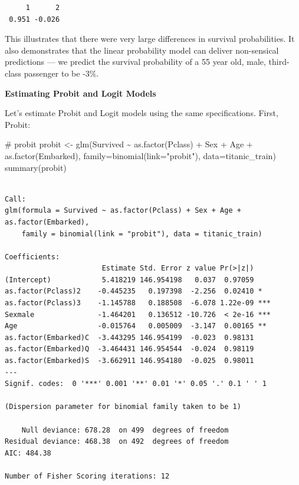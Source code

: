 \documentclass[
  letterpaper,
  DIV=11,
  numbers=noendperiod]{scrreprt}
\newenvironment{Shaded}{\begin{snugshade}}{\end{snugshade}}
\newcommand{\AttributeTok}[1]{\textcolor[rgb]{0.40,0.45,0.13}{#1}}
\newcommand{\CommentTok}[1]{\textcolor[rgb]{0.37,0.37,0.37}{#1}}
\newcommand{\FunctionTok}[1]{\textcolor[rgb]{0.28,0.35,0.67}{#1}}
\newcommand{\NormalTok}[1]{\textcolor[rgb]{0.00,0.23,0.31}{#1}}
\newcommand{\OtherTok}[1]{\textcolor[rgb]{0.00,0.23,0.31}{#1}}
\newcommand{\SpecialCharTok}[1]{\textcolor[rgb]{0.37,0.37,0.37}{#1}}
\newcommand{\StringTok}[1]{\textcolor[rgb]{0.13,0.47,0.30}{#1}}
\begin{document}
\begin{verbatim}
     1      2 
 0.951 -0.026 
\end{verbatim}

This illustrates that there were very large differences in survival
probabilities. It also demonstrates that the linear probability model
can deliver non-sensical predictions --- we predict the survival
probability of a 55 year old, male, third-class passenger to be -3\%.

\textbf{Estimating Probit and Logit Models}

Let's estimate Probit and Logit models using the same specifications.
First, Probit:

\begin{Shaded}
\begin{Highlighting}[]
\CommentTok{\# probit}
\NormalTok{probit }\OtherTok{\textless{}{-}} \FunctionTok{glm}\NormalTok{(Survived }\SpecialCharTok{\textasciitilde{}} \FunctionTok{as.factor}\NormalTok{(Pclass) }\SpecialCharTok{+}\NormalTok{ Sex }\SpecialCharTok{+}\NormalTok{ Age }\SpecialCharTok{+} \FunctionTok{as.factor}\NormalTok{(Embarked), }
              \AttributeTok{family=}\FunctionTok{binomial}\NormalTok{(}\AttributeTok{link=}\StringTok{"probit"}\NormalTok{), }
              \AttributeTok{data=}\NormalTok{titanic\_train)}
\FunctionTok{summary}\NormalTok{(probit)}
\end{Highlighting}
\end{Shaded}

\begin{verbatim}

Call:
glm(formula = Survived ~ as.factor(Pclass) + Sex + Age + as.factor(Embarked), 
    family = binomial(link = "probit"), data = titanic_train)

Coefficients:
                       Estimate Std. Error z value Pr(>|z|)    
(Intercept)            5.418219 146.954198   0.037  0.97059    
as.factor(Pclass)2    -0.445235   0.197398  -2.256  0.02410 *  
as.factor(Pclass)3    -1.145788   0.188508  -6.078 1.22e-09 ***
Sexmale               -1.464201   0.136512 -10.726  < 2e-16 ***
Age                   -0.015764   0.005009  -3.147  0.00165 ** 
as.factor(Embarked)C  -3.443295 146.954199  -0.023  0.98131    
as.factor(Embarked)Q  -3.464431 146.954544  -0.024  0.98119    
as.factor(Embarked)S  -3.662911 146.954180  -0.025  0.98011    
---
Signif. codes:  0 '***' 0.001 '**' 0.01 '*' 0.05 '.' 0.1 ' ' 1

(Dispersion parameter for binomial family taken to be 1)

    Null deviance: 678.28  on 499  degrees of freedom
Residual deviance: 468.38  on 492  degrees of freedom
AIC: 484.38

Number of Fisher Scoring iterations: 12
\end{verbatim}
\end{document}
